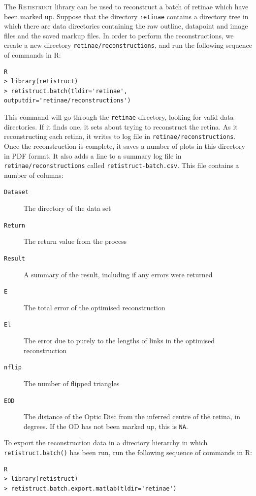 \documentclass{article}
\begin{document}
The \textsc{Retistruct} library can be used to reconstruct a batch of
retinae which have been marked up. Suppose that the directory
\texttt{retinae} contains a directory tree in which there are data
directories containing the raw outline, datapoint and image files and
the saved markup files. In order to perform the reconstructions, we
create a new directory \texttt{retinae/reconstructions}, and run the
following sequence of commands in R:
\begin{verbatim}
R
> library(retistruct)
> retistruct.batch(tldir='retinae', outputdir='retinae/reconstructions')
\end{verbatim}
This command will go through the \texttt{retinae} directory, looking
for valid data directories. If it finds one, it sets about trying to
reconstruct the retina. As it reconstructing each retina, it writes to
log file in \texttt{retinae/reconstructions}. Once the reconstruction
is complete, it saves a number of plots in this directory in PDF
format. It also adds a line to a summary log file in
\texttt{retinae/reconstructions} called
\texttt{retistruct-batch.csv}. This file contains a number of columns:
\begin{description}
\item[\texttt{Dataset}] The directory of the data set
\item[\texttt{Return}] The return value from the process
\item[\texttt{Result}] A summary of the result, including if any
  errors were returned
\item[\texttt{E}] The total error  of the optimised reconstruction
\item[\texttt{El}] The error due to purely to the lengths of links in
  the optimised reconstruction
\item[\texttt{nflip}] The number of flipped triangles
\item[\texttt{EOD}] The distance of the Optic Disc from the inferred
  centre of the retina, in degrees. If the OD has not been marked up,
  this is \texttt{NA}.
\end{description}

To export the reconstruction data in a directory hierarchy in which
\texttt{retistruct.batch()} has been run, run the following sequence
of commands in R:
\begin{verbatim}
R
> library(retistruct)
> retistruct.batch.export.matlab(tldir='retinae')
\end{verbatim}


\appendix
\end{document}
